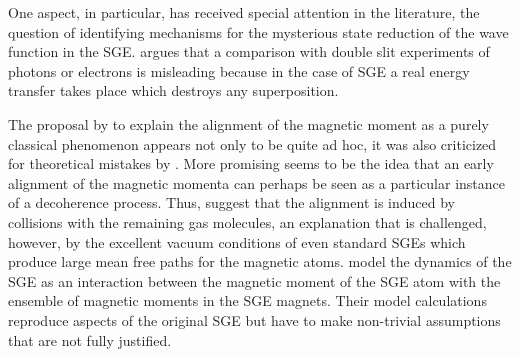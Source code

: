 \documentclass{article}
\begin{document}
One aspect, in particular, has received special attention in the literature, the question of identifying mechanisms for the mysterious state reduction of the wave function in the SGE. \cite{DevereuxM2015Reduction} argues that a comparison with double slit experiments of photons or electrons is misleading because in the case of SGE a real energy transfer takes place which destroys any superposition.

The proposal by \cite{FrancaH2009Phenomenon} to explain the alignment of the magnetic moment as a purely classical phenomenon appears not only to be quite ad hoc, it was also criticized for theoretical mistakes by \cite{RibeiroJ2010Was}. More promising seems to be the idea that an early alignment of the magnetic momenta can perhaps be seen as a particular instance of a decoherence process. Thus, 
\cite{GomisP2016Effects} suggest that the alignment is induced by collisions with the remaining gas molecules, an explanation that is challenged, however, by the excellent vacuum conditions of even standard SGEs which produce large mean free paths for the magnetic atoms. 
\cite{WennerstroemHEtal2012experiment,WennerstroemHEtal2013measurements,WennerstroemHEtal2014Interpretation} model the dynamics of the SGE as an interaction between the magnetic moment of the SGE atom with the ensemble of magnetic moments in the SGE magnets. Their model calculations reproduce aspects of the original SGE but have to make non-trivial assumptions that are not fully justified.
\end{document}
